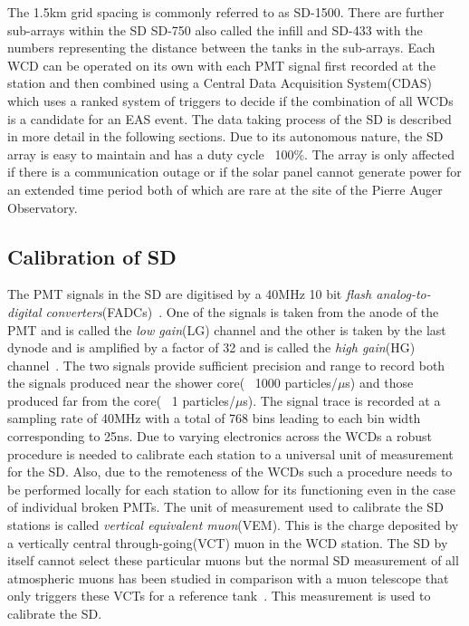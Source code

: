 The 1.5km grid spacing is commonly referred to as SD-1500. There are further sub-arrays within the SD SD-750 also called the infill and SD-433 with the numbers representing the distance between the tanks in the sub-arrays. Each WCD can be operated on its own with each PMT signal first recorded at the station and then combined using a Central Data Acquisition System(CDAS)~\cite{} which uses a ranked system of triggers to decide if the combination of all WCDs is a candidate for an EAS event. The data taking process of the SD is described in more detail in the following sections. Due to its autonomous nature, the SD array is easy to maintain and has a duty cycle ~100\%. The array is only affected if there is a communication outage or if the solar panel cannot generate power for an extended time period both of which are rare at the site of the Pierre Auger Observatory.     

\subsection{Calibration of SD}
\label{sec:Sur_det_calib}

The PMT signals in the SD are digitised by a 40MHz 10 bit \textit{flash analog-to-digital converters}(FADCs)~\cite{}. One of the signals is taken from the anode of the PMT and is called the \textit{low gain}(LG) channel and the other is taken by the last dynode and is amplified by a factor of 32 and is called the \textit{high gain}(HG) channel~\cite{}. The two signals provide sufficient precision and range to record both the signals produced near the shower core( ~1000 particles/$\mu$s) and those produced far from the core( ~1 particles/$\mu$s). The signal trace is recorded at a sampling rate of 40MHz with a total of 768 bins leading to each bin width corresponding to 25ns. Due to varying electronics across the WCDs a robust procedure is needed to calibrate each station to a universal unit of measurement for the SD. Also, due to the remoteness of the WCDs such a procedure needs to be performed locally for each station to allow for its functioning even in the case of individual broken PMTs. The unit of measurement used to calibrate the SD stations is called \textit{vertical equivalent muon}(VEM). This is the charge deposited by a vertically central through-going(VCT) muon in the WCD station. The SD by itself cannot select these particular muons but the normal SD measurement of all atmospheric muons has been studied in comparison with a muon telescope that only triggers these VCTs for a reference tank~\cite{}. This measurement is used to calibrate the SD.

